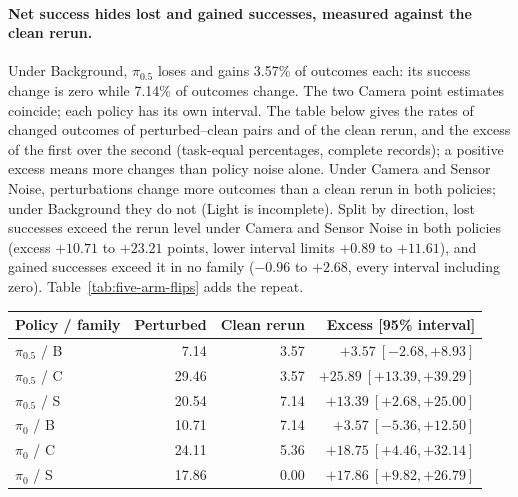 \paragraph{Net success hides lost and gained successes, measured against the clean rerun.}
Under Background, $\pi_{0.5}$ loses and gains 3.57\% of outcomes each: its success change is zero while 7.14\% of outcomes change. The two Camera point estimates coincide; each policy has its own interval. The table below gives the rates of changed outcomes of perturbed--clean pairs and of the clean rerun, and the excess of the first over the second (task-equal percentages, complete records); a positive excess means more changes than policy noise alone. Under Camera and Sensor Noise, perturbations change more outcomes than a clean rerun in both policies; under Background they do not (Light is incomplete). Split by direction, lost successes exceed the rerun level under Camera and Sensor Noise in both policies (excess $+10.71$ to $+23.21$ points, lower interval limits $+0.89$ to $+11.61$), and gained successes exceed it in no family ($-0.96$ to $+2.68$, every interval including zero). Table~\ref{tab:five-arm-flips} adds the repeat.

\begin{center}
\small
\setlength{\tabcolsep}{4pt}
\begin{tabular}{@{}lrrr@{}}
\toprule
Policy / family & Perturbed & Clean rerun & Excess [95\% interval]\\
\midrule
$\pi_{0.5}$ / B & 7.14 & 3.57 & $+3.57\ [-2.68,+8.93]$\\
$\pi_{0.5}$ / C & 29.46 & 3.57 & $+25.89\ [+13.39,+39.29]$\\
$\pi_{0.5}$ / S & 20.54 & 7.14 & $+13.39\ [+2.68,+25.00]$\\
$\pi_0$ / B & 10.71 & 7.14 & $+3.57\ [-5.36,+12.50]$\\
$\pi_0$ / C & 24.11 & 5.36 & $+18.75\ [+4.46,+32.14]$\\
$\pi_0$ / S & 17.86 & 0.00 & $+17.86\ [+9.82,+26.79]$\\
\bottomrule
\end{tabular}
\end{center}


